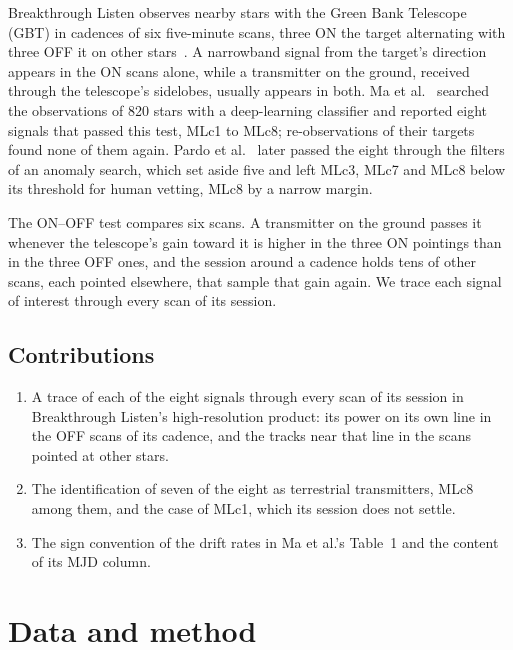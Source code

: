 \documentclass[3p,11pt]{elsarticle}
\begin{document}
Breakthrough Listen observes nearby stars with the Green Bank Telescope (GBT) in cadences of six five-minute scans, three
ON the target alternating with three OFF it on other stars~\cite{Isaacson2017,Enriquez2017}. A narrowband signal from
the target's direction appears in the ON scans alone, while a transmitter on the ground, received through the
telescope's sidelobes, usually appears in both. Ma et al.~\cite{Ma2023} searched the observations of 820 stars with a
deep-learning classifier and reported eight signals that passed this test, MLc1 to MLc8; re-observations of their
targets found none of them again. Pardo et al.~\cite{Pardo2025} later passed the eight through the filters of an
anomaly search, which set aside five and left MLc3, MLc7 and MLc8 below its threshold for human vetting, MLc8 by a
narrow margin.

The ON--OFF test compares six scans. A transmitter on the ground passes it whenever the telescope's gain toward it is
higher in the three ON pointings than in the three OFF ones, and the session around a cadence holds tens of other
scans, each pointed elsewhere, that sample that gain again. We trace each signal of interest through every scan of its
session.

\subsection{Contributions}
\begin{enumerate}[leftmargin=*,itemsep=1pt]
\item A trace of each of the eight signals through every scan of its session in Breakthrough Listen's high-resolution
product: its power on its own line in the OFF scans of its cadence, and the tracks near that line in the scans pointed
at other stars.
\item The identification of seven of the eight as terrestrial transmitters, MLc8 among them, and the case of MLc1,
which its session does not settle.
\item The sign convention of the drift rates in Ma et al.'s Table~1 and the content of its MJD column.
\end{enumerate}

\section{Data and method}\label{sec:method}
\end{document}
